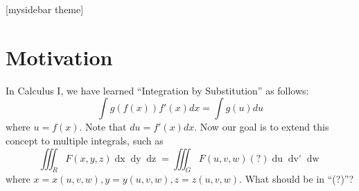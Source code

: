 \documentclass[11pt,t]{beamer}
\begin{document}
[mysidebar theme]

\section{Motivation}
\begin{frame}
    In Calculus I, we have learned ``Integration by Substitution'' as follows:
    \[ \int g(f(x)) f'(x)dx = \int g(u)du \]
    where $u=f(x)$. Note that $du=f'(x)dx$.
    \newline
    Now our goal is to extend this concept to multiple integrals, such as
    \[ \iiint_R F(x,y,z)\mathop{dx}\mathop{dy}\mathop{dz} = \iiint_G F(u,v,w) (?)\mathop{du}\mathop{dv'}\mathop{dw} \]
    where $x=x(u,v,w), y=y(u,v,w), z=z(u,v,w)$. What should be in ``(?)''?
\end{frame}
\end{document}
